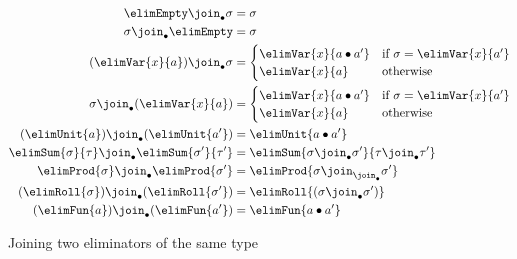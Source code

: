 \begin{figure}
\flushleft {}
{\small
\begin{align*}
\elimEmpty \join_{\bullet} \sigma
&=
\sigma
\\
\sigma \join_{\bullet} \elimEmpty
&=
\sigma
\\
(\elimVar{x}{a}) \join_{\bullet} \sigma
&=
\begin{cases}
\elimVar{x}{a \bullet a'}
& \text{if }\sigma = \elimVar{x}{a'}
\\
\elimVar{x}{a}
& \text{otherwise}
\end{cases}
\\
\sigma \join_{\bullet} (\elimVar{x}{a})
&=
\begin{cases}
\elimVar{x}{a \bullet a'}
& \text{if }\sigma = \elimVar{x}{a'}
\\
\elimVar{x}{a}
& \text{otherwise}
\end{cases}
\\
(\elimUnit{a}) \join_{\bullet} (\elimUnit{a'})
&=
\elimUnit{a \bullet a'}
\\
\elimSum{\sigma}{\tau} \join_{\bullet} \elimSum{\sigma'}{\tau'}
&=
\elimSum{\sigma \join_{\bullet} \sigma'}{\tau \join_{\bullet} \tau'}
\\
\elimProd{\sigma} \join_{\bullet} \elimProd{\sigma'}
&=
\elimProd{\sigma \join_{\join_{\bullet}} \sigma'}
\\
(\elimRoll{\sigma}) \join_{\bullet} (\elimRoll{\sigma'})
&=
\elimRoll{(\sigma \join_{\bullet} \sigma')}
\\
(\elimFun{a}) \join_{\bullet} (\elimFun{a'})
&=
\elimFun{a \bullet a'}
\end{align*}}
\caption{Joining two eliminators of the same type}
\end{figure}
